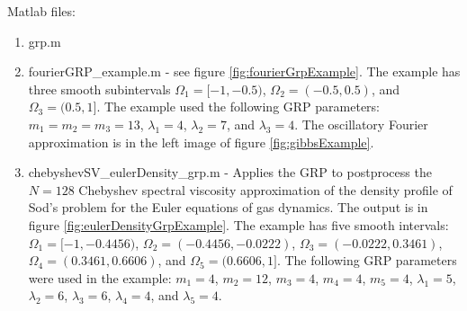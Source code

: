 \documentclass[12pt]{article}
\begin{document}
 Matlab files:
\begin{enumerate}
  \item grp.m
  \item fourierGRP\_example.m - see figure \ref{fig:fourierGrpExample}.  The example has three smooth subintervals $\Omega_1 = [-1,-0.5)$, $\Omega_2 = (-0.5,0.5)$, and $\Omega_3 = (0.5,1]$.  The example used the following GRP parameters: $m_1 = m_2 = m_3 = 13$, $\lambda_1 = 4$, $\lambda_2 = 7$, and $\lambda_3 = 4$.  The oscillatory Fourier approximation is in the left image of figure \ref{fig:gibbsExample}.
  \item chebyshevSV\_eulerDensity\_grp.m - Applies the GRP to postprocess the $N=128$ Chebyshev spectral viscosity approximation of the density profile of Sod's problem \cite{Sod78} for the Euler equations
  of gas dynamics. The output is in figure \ref{fig:eulerDensityGrpExample}.  The example has five smooth intervals: $\Omega_1 = [-1,-0.4456)$,  $\Omega_2 = (-0.4456,-0.0222)$, $\Omega_3 = (-0.0222,0.3461)$, $\Omega_4 = (0.3461,0.6606)$, and $\Omega_5 = (0.6606,1]$. The following GRP parameters were used in the example:  $m_1=4$, $m_2=12$, $m_3=4$, $m_4=4$, $m_5=4$, $\lambda_1=5$, $\lambda_2=6$, $\lambda_3=6$, $\lambda_4=4$, and $\lambda_5=4$.
\end{enumerate}
\end{document}

